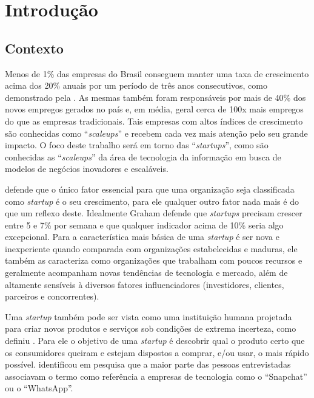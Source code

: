 \chapter{Introdução}
\label{cap-introducao}

\section{Contexto}
\label{section:contexto}

Menos de 1\% das empresas do Brasil conseguem manter uma taxa de crescimento acima dos 20\% anuais por um período de três anos consecutivos, como demonstrado pela . As mesmas também foram responsáveis por mais de 40\% dos novos empregos gerados no país e, em média, geral cerca de 100x mais empregos do que as empresas tradicionais. Tais empresas com altos índices de crescimento são conhecidas como ``\textit{scaleups}'' e recebem cada vez mais atenção pelo seu grande impacto. O foco deste trabalho será em torno das ``\textit{startups}'', como são conhecidas as ``\textit{scaleups}'' da área de tecnologia da informação em busca de modelos de negócios inovadores e escaláveis.

 defende que o único fator essencial para que uma organização seja classificada como \textit{startup} é o seu crescimento, para ele qualquer outro fator nada mais é do que um reflexo deste. Idealmente Graham defende que \textit{startups} precisam crescer entre 5 e 7\% por semana e que qualquer indicador acima de 10\% seria algo excepcional. Para  a característica mais básica de uma \textit{startup} é ser nova e inexperiente quando comparada com organizações estabelecidas e maduras, ele também as caracteriza como organizações que trabalham com poucos recursos e geralmente acompanham novas tendências de tecnologia e mercado, além de altamente sensíveis à diversos fatores influenciadores (investidores, clientes, parceiros e concorrentes).

Uma \textit{startup} também pode ser vista como uma instituição humana projetada para criar novos produtos e serviços sob condições de extrema incerteza, como definiu . Para ele o objetivo de uma \textit{startup} é descobrir qual o produto certo que os consumidores queiram e estejam dispostos a comprar, e/ou usar, o mais rápido possível.  identificou em pesquisa que a maior parte das pessoas entrevistadas associavam o termo como referência a empresas de tecnologia como o ``Snapchat'' ou o ``WhatsApp''.


